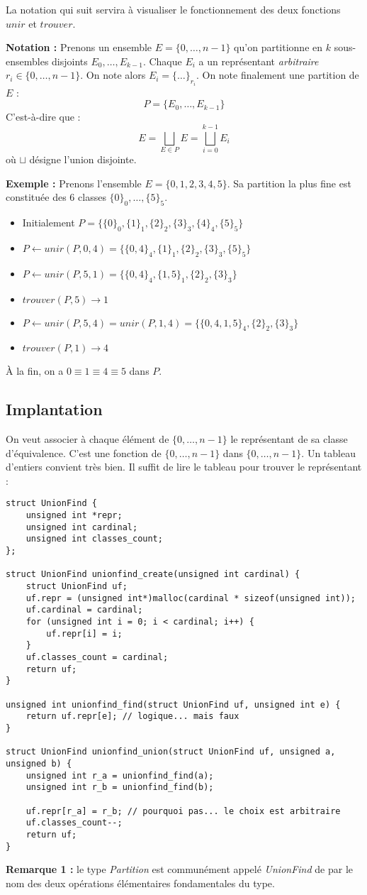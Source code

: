 \documentclass[../../../main.tex]{subfiles}
\begin{document}
La notation qui suit servira à visualiser le fonctionnement des deux fonctions $unir$ et $trouver$.

\textbf{Notation :} Prenons un ensemble $E = \{0, \dots, n-1\}$ qu'on partitionne en $k$ sous-ensembles disjoints $E_0, \dots, E_{k-1}$. Chaque $E_i$ a un représentant \textit{arbitraire} $r_i\in \{0, \dots, n-1\}$. On note alors $E_i = \{\dots\}_{r_i}$.\newline
On note finalement une partition de $E$ :
$$P = \{E_0, \dots, E_{k-1}\}$$
C'est-à-dire que :
$$E = \displaystyle\bigsqcup_{E\in P}E = \displaystyle\bigsqcup_{i=0}^{k-1} E_i$$
où $\sqcup$ désigne l'union disjointe.

\textbf{Exemple :} Prenons l'ensemble $E = \{0, 1, 2, 3, 4, 5\}$. Sa partition la plus fine est constituée des $6$ classes $\{0\}_0, \dots, \{5\}_5$.
\begin{itemize}
	\item Initialement $P = \{\{0\}_0, \{1\}_1, \{2\}_2, \{3\}_3, \{4\}_4, \{5\}_5\}$
	\item $P\leftarrow unir(P, 0, 4) = \{\{0, 4\}_4, \{1\}_1, \{2\}_2, \{3\}_3, \{5\}_5\}$
	\item $P\leftarrow unir(P, 5, 1) = \{\{0, 4\}_4, \{1, 5\}_1, \{2\}_2, \{3\}_3\}$
	\item $trouver(P, 5) \rightarrow 1$
	\item $P \leftarrow unir(P, 5, 4) = unir(P, 1, 4) = \{\{0, 4, 1, 5\}_4, \{2\}_2, \{3\}_3\}$
	\item $trouver(P, 1) \rightarrow 4$
\end{itemize}
À la fin, on a $0\equiv 1\equiv 4\equiv 5$ dans $P$.
\subsection{Implantation}
On veut associer à chaque élément de $\{0, \dots, n-1\}$ le représentant de sa classe d'équivalence. C'est une fonction de $\{0, \dots, n-1\}$ dans $\{0, \dots, n-1\}$. Un tableau d'entiers convient très bien. Il suffit de lire le tableau pour trouver le représentant :
\begin{verbatim}
struct UnionFind {
	unsigned int *repr;
	unsigned int cardinal;
	unsigned int classes_count;
};

struct UnionFind unionfind_create(unsigned int cardinal) {
	struct UnionFind uf;
	uf.repr = (unsigned int*)malloc(cardinal * sizeof(unsigned int));
	uf.cardinal = cardinal;
	for (unsigned int i = 0; i < cardinal; i++) {
		uf.repr[i] = i;
	}
	uf.classes_count = cardinal;
	return uf;
}

unsigned int unionfind_find(struct UnionFind uf, unsigned int e) {
	return uf.repr[e]; // logique... mais faux
}

struct UnionFind unionfind_union(struct UnionFind uf, unsigned a, unsigned b) {
	unsigned int r_a = unionfind_find(a);
	unsigned int r_b = unionfind_find(b);

	uf.repr[r_a] = r_b; // pourquoi pas... le choix est arbitraire
	uf.classes_count--;
	return uf;
}
\end{verbatim}
\textbf{Remarque 1 :} le type \textit{Partition} est communément appelé \textit{UnionFind} de par le nom des deux opérations élémentaires fondamentales du type.
\end{document}
